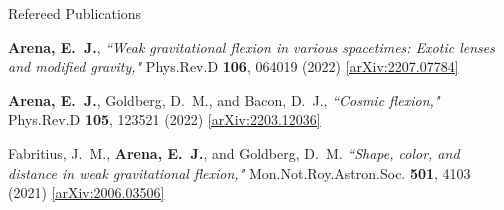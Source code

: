 \documentclass{resume} %
\begin{document}
\begin{rSection}{Refereed Publications}

\begin{etaremune}
\item \textbf{{Arena}, E.~J.}, \textit{``Weak gravitational flexion in various spacetimes: Exotic lenses and modified gravity,"} Phys.Rev.D \textbf{106}, 064019 (2022) \href{https://arxiv.org/abs/2207.07784}{[arXiv:2207.07784]}
    
\item \textbf{{Arena}, E.~J.}, {Goldberg}, D.~M., and {Bacon}, D.~J., \textit{``Cosmic flexion,"} Phys.Rev.D \textbf{105}, 123521 (2022) \href{https://arxiv.org/abs/2203.12036}{[arXiv:2203.12036]}
  
\item {Fabritius}, J.~M., \textbf{{Arena}, E.~J.}, and {Goldberg}, D.~M. \textit{``Shape, color, and distance in weak gravitational flexion,"} Mon.Not.Roy.Astron.Soc. \textbf{501}, 4103 (2021) \href{https://arxiv.org/abs/2006.03506}{[arXiv:2006.03506]}
\end{etaremune}

\end{rSection}

\end{document}
